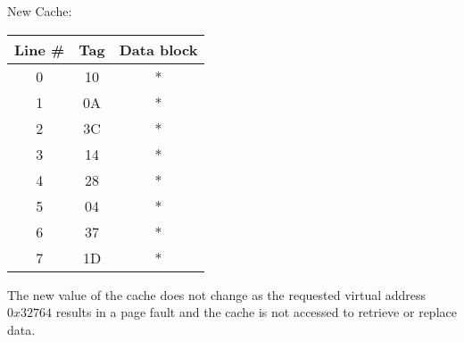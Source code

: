 \documentclass{article}
\begin{document}
 {
     New Cache: \\
     \begin{table}[h]
          \centering
          \begin{tabular}{|c|c|c|}
              \hline
              \textbf{Line \#} & \textbf{Tag} & \textbf{Data block} \\ \hline
              0 & 10 & * \\ \hline
              1 & 0A & * \\ \hline
              2 & 3C & * \\ \hline
              3 & 14 & * \\ \hline
              4 & 28 & * \\ \hline
              5 & 04 & * \\ \hline
              6 & 37 & * \\ \hline
              7 & 1D & * \\ \hline
          \end{tabular}
     \end{table}
     \linebreak
     The new value of the cache does not change as the requested virtual address $0x32764$ results in a page fault and the cache is not accessed to retrieve or replace data. \\
}
\end{document}
